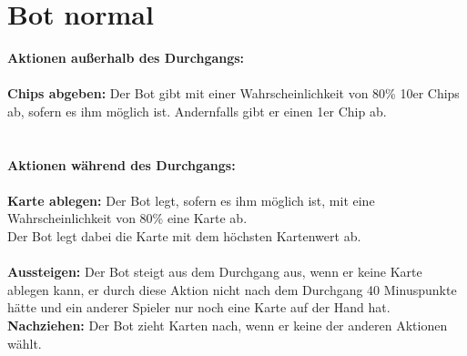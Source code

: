 \section{Bot normal}

\textbf{Aktionen außerhalb des Durchgangs:} \\ \\
\textbf{Chips abgeben:} Der Bot gibt mit einer Wahrscheinlichkeit von 80\% 10er Chips ab, sofern es ihm möglich ist. Andernfalls gibt er einen 1er Chip ab. \\
\\ \\
\textbf{Aktionen während des Durchgangs:} \\ \\
\textbf{Karte ablegen:} Der Bot legt, sofern es ihm möglich ist, mit eine Wahrscheinlichkeit von 80\% eine Karte ab. \\
Der Bot legt dabei die Karte mit dem höchsten Kartenwert ab. 
\\ \\
\textbf{Aussteigen:} Der Bot steigt aus dem Durchgang aus, wenn er keine Karte ablegen kann, er durch diese Aktion nicht nach dem Durchgang 40 Minuspunkte hätte und ein anderer Spieler nur noch eine Karte auf der Hand hat.\\
\textbf{Nachziehen:} Der Bot zieht Karten nach, wenn er keine der anderen Aktionen wählt.

